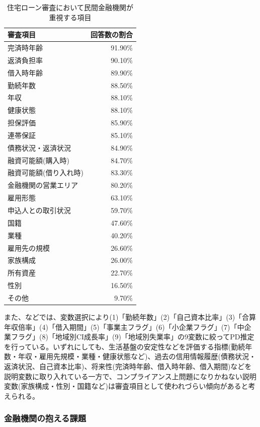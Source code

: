 \documentclass[11pt]{jsarticle}
\begin{document}
\begin{table}[htbp]
\begin{center}
  \begin{tabular}{lr} \hline\hline
    審査項目 & 回答数の割合 \\ \hline\hline
    完済時年齢 & 91.90\% \\
    返済負担率 & 90.10\% \\
    借入時年齢 & 89.90\% \\
    勤続年数 & 88.50\% \\
    年収 & 88.10\% \\
    健康状態 & 88.10\% \\
    担保評価 & 85.90\% \\
    連帯保証 & 85.10\% \\
    債務状況・返済状況 & 84.90\% \\
    融資可能額(購入時) & 84.70\% \\
    融資可能額(借り入れ時) & 83.30\% \\
    金融機関の営業エリア & 80.20\% \\
    雇用形態 & 63.10\% \\
    申込人との取引状況 & 59.70\% \\
    国籍 & 47.60\% \\
    業種 & 40.20\% \\
    雇用先の規模 & 26.60\% \\
    家族構成 & 26.00\% \\
    所有資産 & 22.70\% \\
    性別 & 16.50\% \\
    その他 & 9.70\% \\
  \end{tabular}
  \caption{住宅ローン審査において民間金融機関が重視する項目}
\end{center}
\end{table}
また、\cite{stepwisebayse}などでは、変数選択により(1)「勤続年数」(2)「自己資本比率」(3)「合算年収倍率」(4)「借入期間」(5)「事業主フラグ」(6)「小企業フラグ」(7)「中企業フラグ」(8)「地域別CI成長率」(9)「地域別失業率」の9変数に絞ってPD推定を行っている。いずれにしても、生活基盤の安定性などを評価する指標(勤続年数・年収・雇用先規模・業種・健康状態など)、過去の信用情報履歴(債務状況・返済状況、自己資本比率)、将来性(完済時年齢、借入時年齢、借入期間)などを説明変数に取り入れている一方で、コンプライアンス上問題になりかねない説明変数(家族構成・性別・国籍など)は審査項目として使われづらい傾向があると考えられる。
    \subsubsection{金融機関の抱える課題}\label{ux91d1ux878dux6a5fux95a2ux306eux62b1ux3048ux308bux8ab2ux984c}
\end{document}
